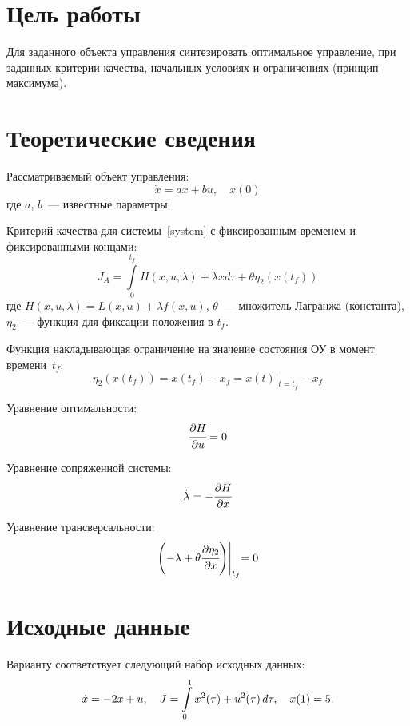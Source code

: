 \section{Цель работы}
Для заданного объекта управления синтезировать оптимальное управление, при заданных критерии качества, начальных условиях и ограничениях  (принцип максимума).



\section{Теоретические сведения}
Рассматриваемый объект управления:
\begin{equation}\label{system}
	\dot{x} = a x + b u, \quad x(0)
\end{equation}
где $a$, $b$~--- известные параметры. 

Критерий качества для системы~\eqref{system} с фиксированным временем и фиксированными концами:
\begin{equation}
	J_A = \int\limits_0^{t_f} H(x,u,\lambda) + \dot\lambda x d \tau + \theta \eta_2 (x(t_f))
\end{equation}
где $H(x,u,\lambda) = L(x,u) + \lambda f(x,u)$, $\theta$~--- множитель Лагранжа (константа), $\eta_2$~--- функция для фиксации положения в $t_f$. 

Функция накладывающая ограничение на значение состояния ОУ в момент времени~$t_f$:
\begin{equation}
	\eta_2 (x(t_f)) = x(t_f) - x_f = x(t) \bigl|_{t = t_f} - x_f
\end{equation}

Уравнение оптимальности:
\begin{equation}
	\cfrac{\partial H}{\partial u} = 0
\end{equation}

Уравнение сопряженной системы:
\begin{equation}
	\dot\lambda = - \cfrac{\partial H}{\partial x}
\end{equation}

Уравнение трансверсальности:
\begin{equation}
	\Biggl( - \lambda + \theta \cfrac{\partial \eta_2}{\partial x} \Biggr) \Biggl|_{t_f}  = 0
\end{equation}


\section{Исходные данные}
Варианту  соответствует следующий набор исходных данных:
\begin{equation}\label{init}
	\dot x = -2 x + u,
	\quad
	J = \int\limits_{0}^{1} x^2(\tau) + u^2(\tau)\, d\tau,
	\quad
	x(1) = 5 \ldotp
\end{equation}


